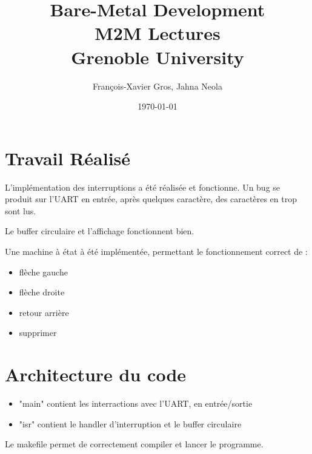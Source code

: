 \documentclass[10]{article}
\begin{document}
\title{Bare-Metal Development \\
M2M Lectures\\
Grenoble University}
\author{François-Xavier Gros, Jahna Neola}
\date{\today}
\maketitle

\section{Travail Réalisé}

L'implémentation des interruptions a été réalisée et fonctionne.
Un bug se produit sur l'UART en entrée, après quelques caractère, des caractères en trop sont lus.

Le buffer circulaire et l'affichage fonctionnent bien.

Une machine à état à été implémentée, permettant le fonctionnement correct de :
\begin{itemize}
  \item flèche gauche
  \item flèche droite
  \item retour arrière 
  \item supprimer
\end{itemize}

\section{Architecture du code}
\begin{itemize}
  \item "main" contient les interractions avec l'UART, en entrée/sortie
  \item "isr" contient le handler d'interruption et le buffer circulaire
\end{itemize}
Le makefile permet de correctement compiler et lancer le programme.
\end{document}
